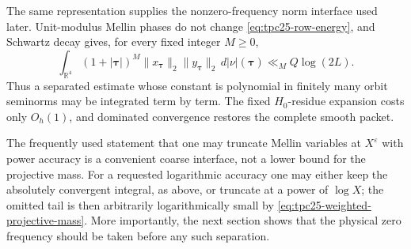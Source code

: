 The same representation supplies the nonzero-frequency norm interface
used later.  Unit-modulus Mellin phases do not change
\eqref{eq:tpc25-row-energy}, and Schwartz decay gives, for every fixed
integer \(M\ge0\),
\begin{equation}
 \int_{\mathbb R^4}(1+|\boldsymbol\tau|)^M
 \|x_{\boldsymbol\tau}\|_2
 \|y_{\boldsymbol\tau}\|_2
 \,d|\nu|(\boldsymbol\tau)
 \ll_M Q\log(2L).
 \label{eq:tpc25-weighted-energy-reassembly}
\end{equation}
Thus a separated estimate whose constant is polynomial in finitely
many orbit seminorms may be integrated term by term.  The fixed
\(H_0\)-residue expansion costs only \(O_h(1)\), and dominated
convergence restores the complete smooth packet.

The frequently used statement that one may truncate Mellin variables
at \(X^\varepsilon\) with power accuracy is a convenient coarse
interface, not a lower bound for the projective mass.  For a requested
logarithmic accuracy one may either keep the absolutely convergent
integral, as above, or truncate at a power of \(\log X\); the omitted
tail is then arbitrarily logarithmically small by
\eqref{eq:tpc25-weighted-projective-mass}.  More importantly, the next
section shows that the physical zero frequency should be taken before
any such separation.
